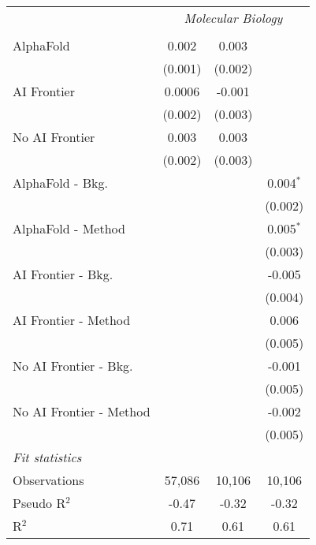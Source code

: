 \begin{tabular}{lccc}
 & \multicolumn{3}{c}{\textit{Molecular Biology}} \\ \\
   AlphaFold               & 0.002   & 0.003   &   \\   
                           & (0.001) & (0.002) &   \\   
   AI Frontier             & 0.0006  & -0.001  &   \\   
                           & (0.002) & (0.003) &   \\   
   No AI Frontier          & 0.003   & 0.003   &   \\   
                           & (0.002) & (0.003) &   \\   
   AlphaFold - Bkg.        &         &         & 0.004$^{*}$\\   
                           &         &         & (0.002)\\   
   AlphaFold - Method      &         &         & 0.005$^{*}$\\   
                           &         &         & (0.003)\\   
   AI Frontier - Bkg.      &         &         & -0.005\\   
                           &         &         & (0.004)\\   
   AI Frontier - Method    &         &         & 0.006\\   
                           &         &         & (0.005)\\   
   No AI Frontier - Bkg.   &         &         & -0.001\\   
                           &         &         & (0.005)\\   
   No AI Frontier - Method &         &         & -0.002\\   
                           &         &         & (0.005)\\   
   \midrule
   \emph{Fit statistics}\\
   Observations            & 57,086  & 10,106  & 10,106\\  
   Pseudo R$^2$            & -0.47   & -0.32   & -0.32\\  
   R$^2$                   & 0.71    & 0.61    & 0.61\\  
   

\end{tabular}
